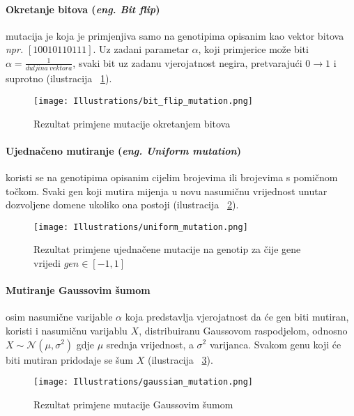 \paragraph{Okretanje bitova (\emph{eng. Bit flip})} 
mutacija je koja je primjenjiva samo na genotipima opisanim kao vektor bitova \emph{npr.} $[1 0 0 1 0 1 1 0 1 1 1]$.
Uz zadani parametar $\alpha$, koji primjerice može biti $\alpha = \frac{1}{duljina\ vektora}$, svaki bit uz zadanu vjerojatnost negira, pretvarajući $0 \rightarrow 1$ i suprotno (ilustracija ~\ref{fig:bit_flip_mutation}).

\begin{figure}
	\centering
	\texttt{[image: Illustrations/bit\_flip\_mutation.png]}
	\caption{Rezultat primjene mutacije okretanjem bitova}
	\label{fig:bit_flip_mutation}
\end{figure}

\paragraph{Ujednačeno mutiranje (\emph{eng. Uniform mutation})}
koristi se na genotipima opisanim cijelim brojevima ili brojevima s pomičnom točkom.
Svaki gen koji mutira mijenja u novu nasumičnu vrijednost unutar dozvoljene domene ukoliko ona postoji (ilustracija ~\ref{fig:uniform_mutation}).

\begin{figure}
	\centering
	\texttt{[image: Illustrations/uniform\_mutation.png]}
	\caption{Rezultat primjene ujednačene mutacije na genotip za čije gene vrijedi $gen \in [-1, 1]$}
	\label{fig:uniform_mutation}
\end{figure}

\paragraph{Mutiranje Gaussovim šumom}
osim nasumične varijable $\alpha$ koja predstavlja vjerojatnost da će gen biti mutiran, koristi i nasumičnu varijablu $X$, distribuiranu Gaussovom raspodjelom, odnosno $X \sim \mathcal{N}(\mu,\sigma^2)$ gdje $\mu$ srednja vrijednost, a $\sigma^2$ varijanca.
Svakom genu koji će biti mutiran pridodaje se šum $X$ (ilustracija ~\ref{fig:gaussian_mutation}).

\begin{figure}
	\centering
	\texttt{[image: Illustrations/gaussian\_mutation.png]}
	\caption{Rezultat primjene mutacije Gaussovim šumom}
	\label{fig:gaussian_mutation}
\end{figure}

